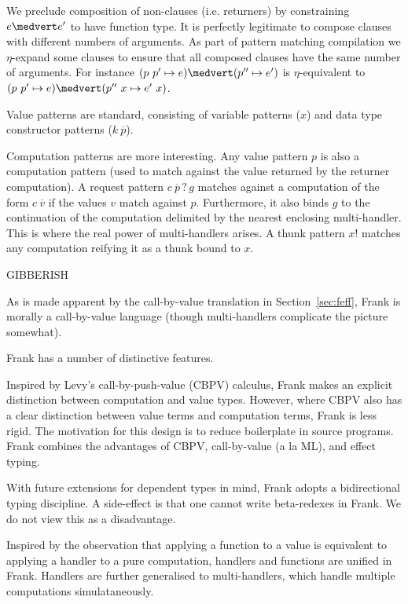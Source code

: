 \documentclass[preprint]{sigplanconf}
\newcommand{\many}{\overline}
\newcommand{\handleSymbol}{\mathbin{?}}
\newcommand{\handle}[2]{{#1} \handleSymbol {#2}}
\newcommand{\force}[1]{{#1}!}
\begin{document}
We preclude composition of non-clauses (i.e. returners) by
constraining $e \medvert e'$ to have function type.
%
It is perfectly legitimate to compose clauses with different numbers
of arguments.
%
As part of pattern matching compilation we $\eta$-expand some clauses
to ensure that all composed clauses have the same number of arguments.
%
For instance $(p~p' \mapsto e) \medvert (p'' \mapsto e')$ is
$\eta$-equivalent to $(p~p' \mapsto e) \medvert (p''~x \mapsto e'~x)$.

Value patterns are standard, consisting of variable patterns ($x$) and
data type constructor patterns ($k~\many{p}$).

Computation patterns are more interesting. Any value pattern $p$ is
also a computation pattern (used to match against the value returned
by the returner computation).
%
A request pattern $\handle{c~\many{p}}{g}$ matches against a
computation of the form $c~\many{v}$ if the values $v$ match against
$p$. Furthermore, it also binds $g$ to the continuation of the
computation delimited by the nearest enclosing multi-handler. This is
where the real power of multi-handlers arises. A thunk pattern
$\force{x}$ matches any computation reifying it as a thunk bound to
$x$.





GIBBERISH






As is made apparent by the call-by-value translation in
Section~\ref{sec:feff}, Frank is morally a call-by-value language
(though multi-handlers complicate the picture somewhat).




Frank has a number of distinctive features.

Inspired by Levy's call-by-push-value (CBPV) calculus, Frank makes an
explicit distinction between computation and value types. However,
where CBPV also has a clear distinction between value terms and
computation terms, Frank is less rigid. The motivation for this design
is to reduce boilerplate in source programs. Frank combines the
advantages of CBPV, call-by-value (a la ML), and effect typing.

With future extensions for dependent types in mind, Frank adopts a
bidirectional typing discipline. A side-effect is that one cannot
write beta-redexes in Frank. We do not view this as a disadvantage.

Inspired by the observation that applying a function to a value is
equivalent to applying a handler to a pure computation, handlers and
functions are unified in Frank. Handlers are further generalised to
multi-handlers, which handle multiple computations simulataneously.
\end{document}
